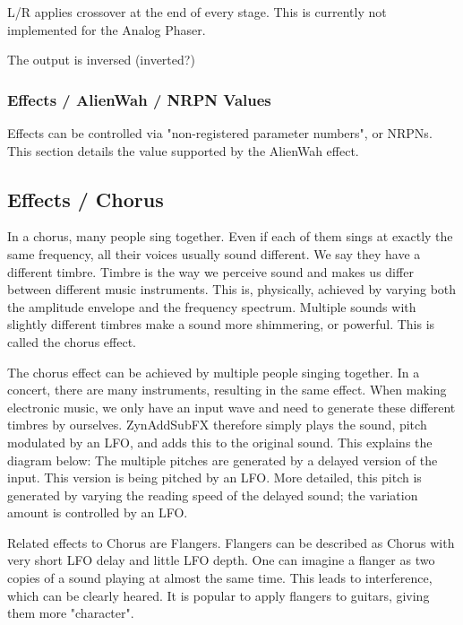    L/R applies crossover at the end of every stage. This is currently not
   implemented for the Analog Phaser.

   The output is inversed (inverted?)

\subsubsection{Effects / AlienWah / NRPN Values}
\label{subsubsec:effects_edit_alienwah_nrpn}

Effects can be controlled via "non-registered parameter numbers", or NRPNs.
This section details the value supported by the AlienWah effect.

\subsection{Effects / Chorus}
\label{subsec:effects_edit_chorus}

   In a chorus, many people sing together. Even if each of them sings at
   exactly the same frequency, all their voices usually sound different. We
   say they have a different timbre. Timbre is the way we perceive sound and
   makes us differ between different music instruments. This is, physically,
   achieved by varying both the amplitude envelope and the frequency
   spectrum. Multiple sounds with slightly different timbres make a sound
   more shimmering, or powerful. This is called the chorus effect.

   The chorus effect can be achieved by multiple people singing together. In
   a concert, there are many instruments, resulting in the same effect. When
   making electronic music, we only have an input wave and need to generate
   these different timbres by ourselves. ZynAddSubFX therefore simply plays
   the sound, pitch modulated by an LFO, and adds this to the original sound.
   This explains the diagram below: The multiple pitches are generated by a
   delayed version of the input. This version is being pitched by an LFO.
   More detailed, this pitch is generated by varying the reading speed of
   the delayed sound; the variation amount is controlled by an LFO.

   Related effects to Chorus are Flangers. Flangers can be described as
   Chorus with very short LFO delay and little LFO depth. One can imagine a
   flanger as two copies of a sound playing at almost the same time. This
   leads to interference, which can be clearly heared. It is popular to apply
   flangers to guitars, giving them more "character".

